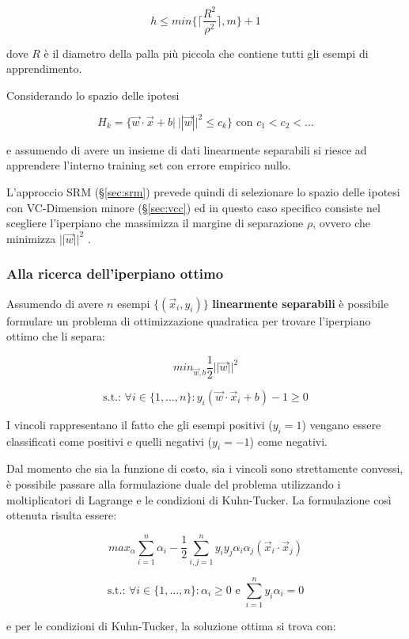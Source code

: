 $$ h \leq min\{\lceil \frac{R^2}{\rho^2}\rceil, m\} +1$$

dove $R$ è il diametro della palla più piccola che contiene tutti gli esempi di apprendimento.

Considerando lo spazio delle ipotesi

$$H_k = \{\vec{w} \cdot \vec{x} + b | \: ||\vec{w}||^2 \leq c_k\} \text{ con } c_1 < c_2 < \ldots$$

e assumendo di avere un insieme di dati linearmente separabili si riesce ad apprendere l'interno training set con errore empirico nullo.

L'approccio SRM (§\ref{sec:srm}) prevede quindi di selezionare lo spazio delle ipotesi con VC-Dimension minore (§\ref{sec:vcc}) ed in questo caso specifico consiste nel scegliere l'iperpiano che massimizza il margine di separazione $\rho$, ovvero che minimizza $||\vec{w}||^2$ .

\subsubsection{Alla ricerca dell'iperpiano ottimo}

Assumendo di avere $n$ esempi $\{(\vec{x}_i, y_i)\}$ \textbf{linearmente separabili} è possibile formulare un problema di ottimizzazione quadratica per trovare l'iperpiano ottimo che li separa:

$$ min_{\vec{w}, b} \frac{1}{2}||\vec{w}||^2 $$

$$ \text{s.t.: } \forall i \in \{1, \ldots , n\} : y_i(\vec{w} \cdot \vec{x}_i + b) - 1 \geq 0 $$

I vincoli rappresentano il fatto che gli esempi positivi ($y_i = 1$) vengano essere classificati come positivi e quelli negativi ($y_i = -1$) come negativi.

Dal momento che sia la funzione di costo, sia i vincoli sono strettamente convessi, è possibile passare alla formulazione duale del problema utilizzando i moltiplicatori di Lagrange e le condizioni di Kuhn-Tucker.
La formulazione così ottenuta risulta essere:

$$max_\alpha \sum\limits_{i=1}^n \alpha_i - \frac{1}{2}\sum\limits_{i,j = 1}^n y_i y_j \alpha_i \alpha_j (\vec{x}_i \cdot \vec{x}_j)$$

$$ \text{s.t.: } \forall i \in \{1, \ldots, n\} : \alpha_i \geq 0 \text{ e } \sum\limits_{i=1}^n y_i \alpha_i = 0$$

e per le condizioni di Kuhn-Tucker, la soluzione ottima si trova con:

